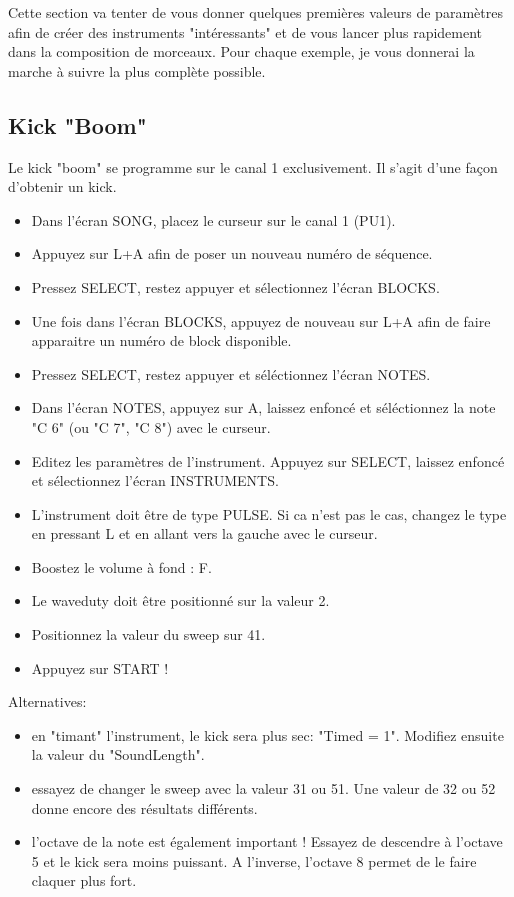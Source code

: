 \documentclass[12pt,a4paper]{article}
\begin{document}
    Cette section va tenter de vous donner quelques premières valeurs de paramètres afin de créer des instruments "intéressants"
    et de vous lancer plus rapidement dans la composition de morceaux.
    Pour chaque exemple, je vous donnerai la marche à suivre la plus complète possible.

    \subsection{Kick "Boom"}

    Le kick "boom" se programme sur le canal 1 exclusivement. Il s'agit d'une façon d'obtenir un kick.
    \medskip

    \begin{itemize}
    \item{Dans l'écran SONG, placez le curseur sur le canal 1 (PU1).}
    \item{Appuyez sur L+A afin de poser un nouveau numéro de séquence.}
    \item{Pressez SELECT, restez appuyer et sélectionnez l'écran BLOCKS.}
    \item{Une fois dans l'écran BLOCKS, appuyez de nouveau sur L+A afin de faire apparaitre un numéro de block disponible.}
    \item{Pressez SELECT, restez appuyer et séléctionnez l'écran NOTES.}
    \item{Dans l'écran NOTES, appuyez sur A, laissez enfoncé et séléctionnez la note "C 6" (ou "C 7", "C 8") avec le curseur.}
    \item{Editez les paramètres de l'instrument. Appuyez sur SELECT, laissez enfoncé et sélectionnez l'écran INSTRUMENTS.}
    \item{L'instrument doit être de type PULSE. Si ca n'est pas le cas, changez le type en pressant L et en allant vers la gauche avec le curseur.}
    \item{Boostez le volume à fond : F.}
    \item{Le waveduty doit être positionné sur la valeur 2.}
    \item{Positionnez la valeur du sweep sur 41.}
    \item{Appuyez sur START !}
    \end{itemize}\medskip

    Alternatives:
    \medskip

    \begin{itemize}
    \item{en "timant" l'instrument, le kick sera plus sec: "Timed = 1". Modifiez ensuite la valeur du "SoundLength".}
    \item{essayez de changer le sweep avec la valeur 31 ou 51. Une valeur de 32 ou 52 donne encore des résultats différents.}
    \item{l'octave de la note est également important ! Essayez de descendre à l'octave 5 et le kick sera moins puissant. A l'inverse, l'octave 8 permet de le faire claquer plus fort.}
    \end{itemize}\medskip
\end{document}
